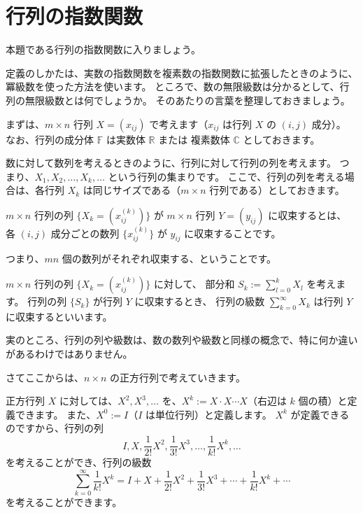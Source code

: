 \documentclass[a5paper]{ltjsarticle}
\begin{document}
\section{行列の指数関数}

本題である行列の指数関数に入りましょう。

定義のしかたは、実数の指数関数を複素数の指数関数に拡張したときのように、冪級数を使った方法を使います。
ところで、数の無限級数は分かるとして、行列の無限級数とは何でしょうか。
そのあたりの言葉を整理しておきましょう。

まずは、\(m \times n\) 行列 \(X = (x_{ij})\) で考えます（\(x_{ij}\) は行列 \(X\) の \((i,j)\) 成分）。
なお、行列の成分体 \(\mathbb{F}\) は実数体 \(\mathbb{R}\) または 複素数体 \(\mathbb{C}\) としておきます。

数に対して数列を考えるときのように、行列に対して行列の列を考えます。
つまり、\(X_1, X_2, \dots, X_k, \dots \) という行列の集まりです。
ここで、行列の列を考える場合は、各行列 \(X_k\) は同じサイズである（\(m \times n\) 行列である）としておきます。

\begin{usmdefinition}[行列の極限]
    \(m \times n\) 行列の列 \( \{X_k = (x^{(k)}_{ij})\} \) が \(m \times n\) 行列 \(Y = (y_{ij})\) に収束するとは、
    各 \((i,j)\) 成分ごとの数列 \( \{x^{(k)}_{ij} \} \) が \(y_{ij}\) に収束することです。
\end{usmdefinition}

つまり、\(mn\) 個の数列がそれぞれ収束する、ということです。

\begin{usmdefinition}[行列の級数]
    \(m \times n\) 行列の列 \( \{X_k = (x^{(k)}_{ij})\} \) に対して、
    部分和 \(\displaystyle S_k := \sum_{l=0}^k X_l\) を考えます。
    行列の列 \( \{S_k\} \) が行列 \(Y\) に収束するとき、
    行列の級数 \( \displaystyle \sum_{k=0}^{\infty} X_k \) は行列 \(Y\) に収束するといいます。
\end{usmdefinition}

実のところ、行列の列や級数は、数の数列や級数と同様の概念で、特に何か違いがあるわけではありません。

さてここからは、\(n \times n\) の正方行列で考えていきます。

正方行列 \(X\) に対しては、\(X^2, X^3, \dots \) を、\(X^k := X \cdot X \cdots X\)（右辺は \(k\) 個の積）と定義できます。
また、\(X^0 := I\)（\(I\) は単位行列）と定義します。
\(X^k\) が定義できるのですから、行列の列
\[
    I, X, \frac{1}{2!} X^2, \frac{1}{3!} X^3, \dots, \frac{1}{k!} X^k, \dots
\]
を考えることができ、行列の級数
\[
    \sum_{k=0}^{\infty} \frac{1}{k!} X^k
    = I + X + \frac{1}{2!}X^2 + \frac{1}{3!}X^3 + \cdots + \frac{1}{k!}X^k + \cdots
\]
を考えることができます。
\end{document}
